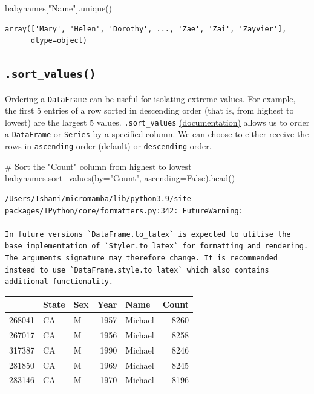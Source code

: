\documentclass[
  letterpaper,
  DIV=11,
  numbers=noendperiod]{scrreprt}
\newenvironment{Shaded}{\begin{snugshade}}{\end{snugshade}}
\newcommand{\CommentTok}[1]{\textcolor[rgb]{0.37,0.37,0.37}{#1}}
\newcommand{\NormalTok}[1]{\textcolor[rgb]{0.00,0.23,0.31}{#1}}
\newcommand{\OperatorTok}[1]{\textcolor[rgb]{0.37,0.37,0.37}{#1}}
\newcommand{\StringTok}[1]{\textcolor[rgb]{0.13,0.47,0.30}{#1}}
\newcommand{\VariableTok}[1]{\textcolor[rgb]{0.07,0.07,0.07}{#1}}
\begin{document}
\begin{Shaded}
\begin{Highlighting}[]
\NormalTok{babynames[}\StringTok{"Name"}\NormalTok{].unique()}
\end{Highlighting}
\end{Shaded}

\begin{verbatim}
array(['Mary', 'Helen', 'Dorothy', ..., 'Zae', 'Zai', 'Zayvier'],
      dtype=object)
\end{verbatim}

\hypertarget{sort_values}{%
\subsection{\texorpdfstring{\texttt{.sort\_values()}}{.sort\_values()}}\label{sort_values}}

Ordering a \texttt{DataFrame} can be useful for isolating extreme
values. For example, the first 5 entries of a row sorted in descending
order (that is, from highest to lowest) are the largest 5 values.
\texttt{.sort\_values}
\href{https://pandas.pydata.org/docs/reference/api/pandas.DataFrame.sort_values.html}{(documentation)}
allows us to order a \texttt{DataFrame} or \texttt{Series} by a
specified column. We can choose to either receive the rows in
\texttt{ascending} order (default) or \texttt{descending} order.

\begin{Shaded}
\begin{Highlighting}[]
\CommentTok{\# Sort the "Count" column from highest to lowest}
\NormalTok{babynames.sort\_values(by}\OperatorTok{=}\StringTok{"Count"}\NormalTok{, ascending}\OperatorTok{=}\VariableTok{False}\NormalTok{).head()}
\end{Highlighting}
\end{Shaded}

\begin{verbatim}
/Users/Ishani/micromamba/lib/python3.9/site-packages/IPython/core/formatters.py:342: FutureWarning:

In future versions `DataFrame.to_latex` is expected to utilise the base implementation of `Styler.to_latex` for formatting and rendering. The arguments signature may therefore change. It is recommended instead to use `DataFrame.style.to_latex` which also contains additional functionality.
\end{verbatim}

\begin{tabular}{lllrlr}
\toprule
{} & State & Sex &  Year &     Name &  Count \\
\midrule
268041 &    CA &   M &  1957 &  Michael &   8260 \\
267017 &    CA &   M &  1956 &  Michael &   8258 \\
317387 &    CA &   M &  1990 &  Michael &   8246 \\
281850 &    CA &   M &  1969 &  Michael &   8245 \\
283146 &    CA &   M &  1970 &  Michael &   8196 \\
\bottomrule
\end{tabular}
\end{document}
